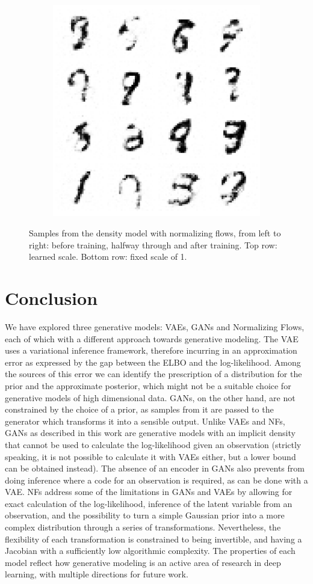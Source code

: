 \documentclass{article}
\begin{document}
\begin{figure}[t]
\begin{subfigure}{0.32\textwidth}
\includegraphics[scale=0.2]{img/nf_noscale_sample_40}
\end{subfigure}
 \caption{Samples from the density model with normalizing flows, from left to right: before training, halfway through and after training. Top row: learned scale. Bottom row: fixed scale of 1.}
\label{fig:nf_samples}
\end{figure}

\section{Conclusion}

We have explored three generative models: VAEs, GANs and Normalizing Flows, each of which with a different approach towards generative modeling. The VAE uses a variational inference framework, therefore incurring in an approximation error as expressed by the gap between the ELBO and the log-likelihood. Among the sources of this error we can identify the prescription of a distribution for the prior and the approximate posterior, which might not be a suitable choice for generative models of high dimensional data. GANs, on the other hand, are not constrained by the choice of a prior, as samples from it are passed to the generator which transforms it into a sensible output. Unlike VAEs and NFs, GANs as described in this work are generative models with an implicit density that cannot be used to calculate the log-likelihood given an observation (strictly speaking, it is not possible to calculate it with VAEs either, but a lower bound can be obtained instead). The absence of an encoder in GANs also prevents from doing inference where a code for an observation is required, as can be done with a VAE. NFs address some of the limitations in GANs and VAEs by allowing for exact calculation of the log-likelihood, inference of the latent variable from an observation, and the possibility to turn a simple Gaussian prior into a more complex distribution through a series of transformations. Nevertheless, the flexibility of each transformation is constrained to being invertible, and having a Jacobian with a sufficiently low algorithmic complexity. The properties of each model reflect how generative modeling is an active area of research in deep learning, with multiple directions for future work.



\end{document}
